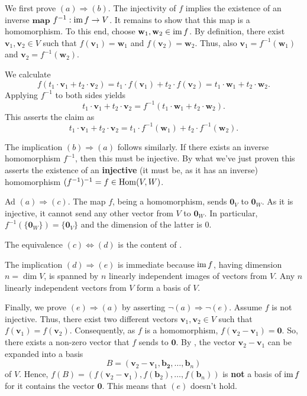 \begin{corproof}
 We first prove $(a) \Rightarrow (b)$. The injectivity of $f$ implies the
 existence of an inverse $\mathbf{map}$ $f^{-1}: \operatorname{im} f \to V$. It remains to
 show that this map is a homomorphism. To this end, choose
 $\mathbf{w}_1,\mathbf{w}_2 \in \operatorname{im} f$. By definition, there exist
 $\mathbf{v}_1,\mathbf{v}_2 \in V$ such that $f(\mathbf{v}_1) = \mathbf{w}_1$
 and $f(\mathbf{v}_2) = \mathbf{w}_2$. Thus, also $\mathbf{v}_1 =
 f^{-1}(\mathbf{w}_1)$ and $\mathbf{v}_2 = f^{-1}(\mathbf{w}_2)$.
 
 We calculate
 \[
  f(t_1 \cdot \mathbf{v}_1 + t_2 \cdot \mathbf{v}_2) = t_1 \cdot f(\mathbf{v}_1)
  + t_2 \cdot f(\mathbf{v}_2) = t_1 \cdot \mathbf{w}_1 + t_2 \cdot \mathbf{w}_2.
 \]
 Applying $f^{-1}$ to both sides yields
 \[
  t_1 \cdot \mathbf{v}_1 + t_2 \cdot \mathbf{v}_2 = f^{-1}(t_1 \cdot
  \mathbf{w}_1 + t_2 \cdot \mathbf{w}_2).
 \]
 This asserts the claim as
 \[
  t_1 \cdot \mathbf{v}_1 + t_2 \cdot \mathbf{v}_2 = t_1 \cdot
  f^{-1}(\mathbf{w}_1) + t_2 \cdot f^{-1}(\mathbf{w}_2).
 \]

 The implication $(b) \Rightarrow (a)$ follows similarly. If there exists an
 inverse homomorphism $f^{-1}$, then this must be injective. By what we've just
 proven this asserts the existence of an \textbf{injective} (it must be, as it
 has an inverse) homomorphism $(f^{-1})^{-1} = f \in \operatorname{Hom}(V,W)$.

 Ad $(a) \Rightarrow (c)$. The map $f$, being a homomorphism, sends
 $\mathbf{0}_V$ to $\mathbf{0}_W$. As it is injective, it cannot send any other
 vector from $V$ to $\mathbf{0}_W$. In particular, $f^{-1}(\{\mathbf{0}_W\}) =
 \{\mathbf{0}_V\}$ and the dimension of the latter is $0$.

 The equivalence $(c) \Leftrightarrow (d)$ is the content of
 .

 The implication $(d) \Rightarrow (e)$ is immediate because $\operatorname{im} f$, having
 dimension $n = \dim V$, is spanned by $n$ linearly independent images of
 vectors from $V$. Any $n$ linearly independent vectors from $V$ form a basis of
 $V$.

 Finally, we prove $(e) \Rightarrow (a)$ by asserting $\neg (a) \Rightarrow \neg
 (e)$. Assume $f$ is not injective. Thus, there exist two different vectors
 $\mathbf{v}_1,\mathbf{v}_2 \in V$ such that $f(\mathbf{v}_1) =
 f(\mathbf{v}_2)$. Consequently, as $f$ is a homomorphism, $f(\mathbf{v}_2 -
 \mathbf{v}_1) = \mathbf{0}$. So, there exists a non-zero vector that $f$ sends
 to $\mathbf{0}$. By , the vector
 $\mathbf{v}_2-\mathbf{v}_1$ can be expanded into a basis
 \[
  B = (\mathbf{v}_2-\mathbf{v}_1,\mathbf{b_2},\ldots,\mathbf{b}_n)
 \]
 of $V$. Hence, $f(B) = (f(\mathbf{v}_2 -
 \mathbf{v}_1),f(\mathbf{b}_2),\ldots,f(\mathbf{b}_n))$ is \textbf{not} a basis
 of $\operatorname{im} f$ for it contains the vector $\mathbf{0}$. This means that $(e)$
 doesn't hold.
\end{corproof}
